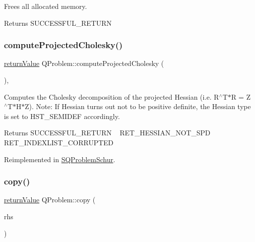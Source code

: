 Frees all allocated memory. \begin{DoxyReturn}{Returns}
S\+U\+C\+C\+E\+S\+S\+F\+U\+L\+\_\+\+R\+E\+T\+U\+RN 
\end{DoxyReturn}
\mbox{\label{class_q_problem_a0708ec4315696dd5462406cd0910bee2}} 
\subsubsection{\texorpdfstring{compute\+Projected\+Cholesky()}{computeProjectedCholesky()}}
{\footnotesize\ttfamily \hyperlink{_message_handling_8hpp_a81d556f613bfbabd0b1f9488c0fa865e}{return\+Value} Q\+Problem\+::compute\+Projected\+Cholesky (\begin{DoxyParamCaption}{ }\end{DoxyParamCaption})\hspace{0.3cm}{\ttfamily [protected]}, {\ttfamily [virtual]}}

Computes the Cholesky decomposition of the projected Hessian (i.\+e. R$^\wedge$\+T$\ast$R = Z$^\wedge$\+T$\ast$\+H$\ast$Z). Note\+: If Hessian turns out not to be positive definite, the Hessian type is set to H\+S\+T\+\_\+\+S\+E\+M\+I\+D\+EF accordingly. \begin{DoxyReturn}{Returns}
S\+U\+C\+C\+E\+S\+S\+F\+U\+L\+\_\+\+R\+E\+T\+U\+RN ~\newline
 R\+E\+T\+\_\+\+H\+E\+S\+S\+I\+A\+N\+\_\+\+N\+O\+T\+\_\+\+S\+PD ~\newline
 R\+E\+T\+\_\+\+I\+N\+D\+E\+X\+L\+I\+S\+T\+\_\+\+C\+O\+R\+R\+U\+P\+T\+ED 
\end{DoxyReturn}


Reimplemented in \hyperlink{class_s_q_problem_schur_aa98408881b63d7bd758df680603a1bb9}{S\+Q\+Problem\+Schur}.

\mbox{\label{class_q_problem_a368a4cf5e6133a1d851b720487fbb41f}} 
\subsubsection{\texorpdfstring{copy()}{copy()}}
{\footnotesize\ttfamily \hyperlink{_message_handling_8hpp_a81d556f613bfbabd0b1f9488c0fa865e}{return\+Value} Q\+Problem\+::copy (\begin{DoxyParamCaption}\item[{const \hyperlink{class_q_problem}{Q\+Problem} \&}]{rhs }\end{DoxyParamCaption})\hspace{0.3cm}{\ttfamily [protected]}}

